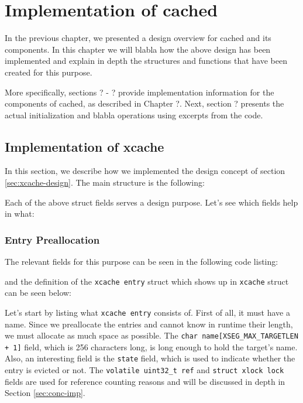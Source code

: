 \chapter{Implementation of cached}\label{ch:cached-implementation}

In the previous chapter, we presented a design overview for cached and its 
components. In this chapter we will blabla how the above design has been
implemented and explain in depth the structures and functions that have been 
created for this purpose.

More specifically, sections ? - ? provide implementation information for the 
components of cached, as described in Chapter ?. Next, section ? presents the 
actual initialization and blabla operations using excerpts from the code.

\section{Implementation of xcache}

In this section, we describe how we implemented the design concept of section 
\ref{sec:xcache-design}. The main \xcache structure is the following:


Each of the above \xcache struct fields serves a design purpose.
Let's see which fields help in what:

\subsection{Entry Preallocation}

The relevant fields for this purpose can be seen in the following code listing:


and the definition of the \texttt{xcache entry} struct which shows up in 
\texttt{xcache} struct can be seen below:


Let's start by listing what \texttt{xcache entry} consists of. First of all, it 
must have a name. Since we preallocate the entries and cannot know in runtime 
their length, we must allocate as much space as possible. The \texttt{char 
	name[XSEG\_MAX\_TARGETLEN + 1]} field, which is 256 characters long, is long 
enough to hold the target's name. Also, an interesting field is the 
\texttt{state} field, which is used to indicate whether the entry is evicted or 
not. The \texttt{volatile uint32\_t ref} and \texttt{struct xlock lock} fields 
are used for reference counting reasons and will be discussed in depth in 
Section \ref{sec:conc-imp}.

